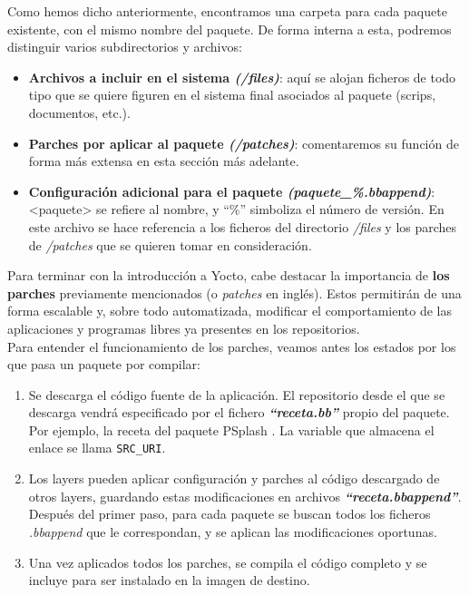 Como hemos dicho anteriormente, encontramos una carpeta para cada paquete existente, con el mismo nombre del paquete. De forma interna a esta, podremos distinguir varios subdirectorios y archivos:

\begin{itemize}
	\item \textbf{Archivos a incluir en el sistema \textit{(/files)}}: aquí se alojan ficheros de todo tipo que se quiere figuren en el sistema final asociados al paquete (scrips, documentos, etc.).
	\item \textbf{Parches por aplicar al paquete \textit{(/patches)}}: comentaremos su función de forma más extensa en esta sección más adelante.
	\item \textbf{Configuración adicional para el paquete \textit{(paquete\_\%.bbappend)}}: <paquete> se refiere al nombre, y ``\%'' simboliza el número de versión. En este archivo se hace referencia a los ficheros del directorio \textit{/files} y los parches de \textit{/patches} que se quieren tomar en consideración.
\end{itemize}

Para terminar con la introducción a Yocto, cabe destacar la importancia de \textbf{los parches} previamente mencionados (o \textit{patches} en inglés). Estos permitirán de una forma escalable y, sobre todo automatizada, modificar el comportamiento de las aplicaciones y programas libres ya presentes en los repositorios.\\

Para entender el funcionamiento de los parches, veamos antes los estados por los que pasa un paquete por compilar:

\begin{enumerate}
	\item Se descarga el código fuente de la aplicación. El repositorio desde el que se descarga vendrá especificado por el fichero \textbf{\textit{``receta.bb''}} propio del paquete. Por ejemplo, la receta del paquete PSplash \cite{yocto-recipe-psplash}. La variable que almacena el enlace se llama \texttt{SRC\_URI}.
	\item Los layers pueden aplicar configuración y parches al código descargado de otros layers, guardando estas modificaciones en archivos \textbf{\textit{``receta.bbappend''}}. Después del primer paso, para cada paquete se buscan todos los ficheros \textit{.bbappend} que le correspondan, y se aplican las modificaciones oportunas.
	\item Una vez aplicados todos los parches, se compila el código completo y se incluye para ser instalado en la imagen de destino.
\end{enumerate}

